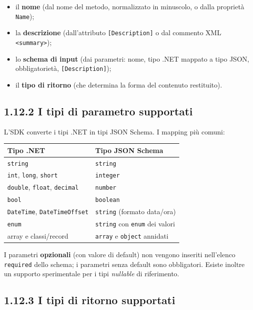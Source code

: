 \documentclass[
  italian,
  10pt,
]{book}
\newcounter{none} %
\providecommand{\tightlist}{%
  \setlength{\itemsep}{0pt}\setlength{\parskip}{0pt}}
\begin{document}
\begin{itemize}
\tightlist
\item
  il \textbf{nome} (dal nome del metodo, normalizzato in minuscolo, o
  dalla proprietà \texttt{Name});
\item
  la \textbf{descrizione} (dall'attributo \texttt{{[}Description{]}} o
  dal commento XML \texttt{\textless{}summary\textgreater{}});
\item
  lo \textbf{schema di input} (dai parametri: nome, tipo .NET mappato a
  tipo JSON, obbligatorietà, \texttt{{[}Description{]}});
\item
  il \textbf{tipo di ritorno} (che determina la forma del contenuto
  restituito).
\end{itemize}

\subsection{1.12.2 I tipi di parametro
supportati}\label{i-tipi-di-parametro-supportati}

L'SDK converte i tipi .NET in tipi JSON Schema. I mapping più comuni:

{\def\LTcaptype{none} %
\begin{longtable}[]{@{}ll@{}}
\toprule\noalign{}
Tipo .NET & Tipo JSON Schema \\
\midrule\noalign{}
\endhead
\bottomrule\noalign{}
\endlastfoot
\texttt{string} & \texttt{string} \\
\texttt{int}, \texttt{long}, \texttt{short} & \texttt{integer} \\
\texttt{double}, \texttt{float}, \texttt{decimal} & \texttt{number} \\
\texttt{bool} & \texttt{boolean} \\
\texttt{DateTime}, \texttt{DateTimeOffset} & \texttt{string} (formato
data/ora) \\
\texttt{enum} & \texttt{string} con \texttt{enum} dei valori \\
array e classi/record & \texttt{array} e \texttt{object} annidati \\
\end{longtable}
}

I parametri \textbf{opzionali} (con valore di default) non vengono
inseriti nell'elenco \texttt{required} dello schema; i parametri senza
default sono obbligatori. Esiste inoltre un supporto sperimentale per i
tipi \emph{nullable} di riferimento.

\subsection{1.12.3 I tipi di ritorno
supportati}\label{i-tipi-di-ritorno-supportati}
\end{document}
